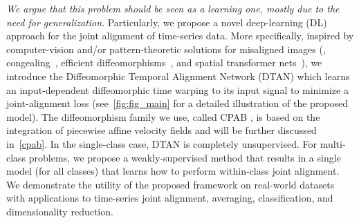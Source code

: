 %
\emph{We argue that this problem should be seen as a learning one,
mostly due to the need for generalization}.
Particularly, we propose a novel deep-learning (DL) approach for the joint alignment of time-series data.
%
More specifically, inspired by computer-vision 
and/or pattern-theoretic solutions for misaligned images
(\eg, congealing~\cite{Miller:CVPR:2000:learning,Learned:PAMI:2006:align,Huang:CVPR:2007:unsupervised,Huang:NIPS:2012:learning,Cox:CVPR:2008:LS,Cox:ICCV:2009:LS}, 
efficient diffeomorphisms~\cite{Freifeld:ICCV:2015:CPAB,Freifeld:PAMI:2017:CPAB, Zhang:IPMI:2015,Zhang:IJCV:2018:fast}, and spatial transformer nets~\cite{Jaderberg:NIPS:2015:spatial,Lin:CPVR:2017:inverse,Skafte:CVPR:2018:DDTN}),
we introduce the Diffeomorphic Temporal Alignment Network (DTAN) which learns an input-dependent diffeomorphic 
time warping to its input signal to minimize a joint-alignment loss (see~\autoref{fig:fig_main} for a detailed illustration of the proposed model). The diffeomorphism family we use, called CPAB
\cite{Freifeld:ICCV:2015:CPAB,Freifeld:PAMI:2017:CPAB}, is 
based on the integration of piecewise affine velocity fields 
 and will be further discussed in~\autoref{cpab}.
In the single-class case, DTAN is completely unsupervised. For multi-class problems, 
we propose a weakly-supervised method that results in a single model (for all classes) that learns how to perform within-class joint alignment.
We demonstrate the utility of the proposed framework on real-world datasets with applications to time-series
 joint alignment, averaging, classification, and dimensionality reduction. 
 
